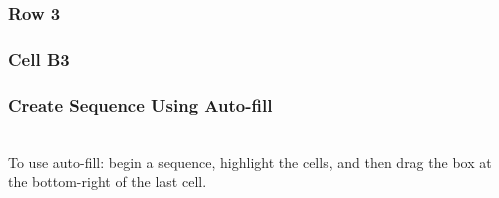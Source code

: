 \documentclass[color=usenames,dvipsnames]{beamer}\usepackage[]{graphicx}\usepackage[]{xcolor}
\begin{document}
\begin{frame}
  \frametitle{Row 3}
\end{frame}



\begin{frame}
  \frametitle{Cell B3}
\end{frame}



\begin{frame}
  \frametitle{Create Sequence Using Auto-fill}
   \\
  \centering
  To use auto-fill: begin a sequence, highlight the cells, and then
  drag the box at the bottom-right of the last cell. \\
\end{frame}
\end{document}
